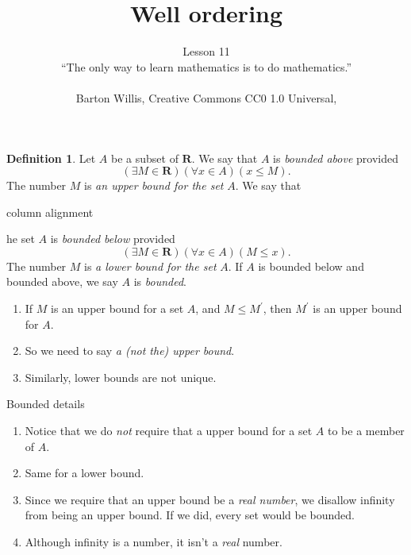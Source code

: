 \documentclass[fleqn]{beamer}
\title{\textbf{Well ordering}}
\subtitle{Lesson 11   \\ \vspace{0.5in}
  ``The only way to learn mathematics is to do mathematics.''  \\   \vspace{0.15in}{Paul Halmos} \\
 \vspace{1.0in}
  \tiny Barton Willis, Creative Commons CC0 1.0 Universal, \the\year \normalsize
   }
\date{}
\newcommand{\reals}{\mathbf{R}}
\theoremstyle{definition}
\newtheorem{mydef}{Definition}
\newenvironment{numberlist}
   {\begin{enumerate}[(1)]
       \addtolength{\itemsep}{-0.5\itemsep}}
     {\end{enumerate}}
\begin{document}
\frame{\titlepage}


\begin{frame}

\begin{mydef} Let \(A\) be a subset of \(\reals\). We say that \(A\) is \emph{bounded above} provided
\[
   \left (\exists M \in \reals \right) \left( \forall x \in A \right)(x \leq M).
\]
The number \(M\) is \emph{an upper bound for  the set } \(A\).
We say that \begin{tabular}{column alignment}

\end{tabular}he set  \(A\) is \emph{bounded below} provided
\[
   \left (\exists M \in \reals \right) \left( \forall x \in A \right)(M \leq x).
\]
The number \(M\) is \emph{a lower bound for  the set } \(A\). If \(A\) is bounded below and bounded above, we say \(A\) is \emph{bounded}.
\end{mydef}

\begin{numberlist}
  \item If \(M\) is an upper bound for a set \(A\), and \(M \leq M^\prime\),
  then \(M^\prime\) is an upper bound for \(A\).

   \item So we need to say \emph{a (not the) upper bound}.

   \item Similarly, lower bounds are not unique.
\end{numberlist}
\end{frame}
\begin{frame}{Bounded details}

\begin{numberlist}

\item Notice that we do \emph{not} require that a upper bound for a set \(A\) to be a member of \(A\).

\vspace{0.15in}
\item Same for a lower bound.

\vspace{0.15in}

\item Since we require that an upper bound be a \emph{real number}, we disallow infinity from being an upper bound.  If we did, every set would be bounded.

\vspace{0.15in}
\item Although infinity is a number, it isn't a \emph{real} number.
\end{numberlist}

\end{frame}
\end{document}
